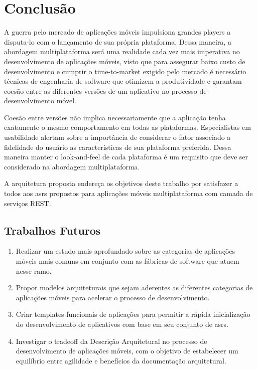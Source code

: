 \documentclass[
	article,			%
	11pt,				%
	oneside,			%
	a4paper,			%
	english,			%
	brazil,				%
	sumario=tradicional
]{abntex2}
\begin{document}
\chapter{Conclusão}
A guerra pelo mercado de aplicações móveis impulsiona grandes players a disputa-lo com o lançamento de sua própria plataforma. Dessa maneira, a abordagem multiplataforma será uma realidade cada vez mais imperativa no desenvolvimento de aplicações móveis, visto que para assegurar baixo custo de desenvolvimento e cumprir o time-to-market exigido pelo mercado é necessário técnicas de engenharia de software que otimizem a produtividade e garantam coesão entre as diferentes versões de um aplicativo no processo de desenvolvimento móvel.

Coesão entre versões não implica necessariamente que a aplicação tenha exatamente o mesmo comportamento em todas as plataformas. Especialistas em usabilidade alertam sobre a importância de considerar o fator associado a fidelidade do usuário as características de sua plataforma preferida. Dessa maneira manter o look-and-feel de cada plataforma é um requisito que deve ser considerado na abordagem multiplataforma.

A arquitetura proposta endereça os objetivos deste trabalho por satisfazer a todos aos \glspl{asr} propostos para aplicações móveis multiplataforma com camada de serviços REST.

\section{Trabalhos Futuros}
\begin{enumerate}
	\item Realizar um estudo mais aprofundado sobre as categorias de aplicações móveis mais comuns em conjunto com as fábricas de software que atuem nesse ramo.
	\item Propor modelos arquiteturais que sejam aderentes as diferentes categorias de aplicações móveis para acelerar o processo de desenvolvimento.
	\item Criar templates funcionais de aplicações para permitir a rápida inicialização do desenvolvimento de aplicativos com base em seu conjunto de \glspl{asr}.
	\item Investigar o tradeoff da Descrição Arquitetural no processo de desenvolvimento de aplicações móveis, com o objetivo de estabelecer um equilíbrio entre agilidade e benefícios da documentação arquitetural.
\end{enumerate}
{}
\end{document}
